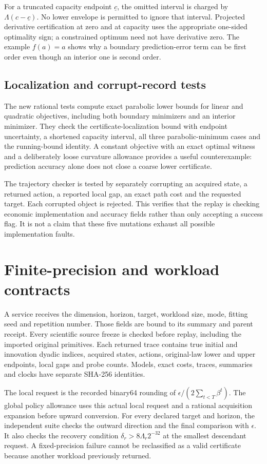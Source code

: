 For a truncated capacity endpoint $\underline c$, the omitted interval is charged by $\Lambda(c-\underline c)$. No lower envelope is permitted to ignore that interval. Projected derivative certification at zero and at capacity uses the appropriate one-sided optimality sign; a constrained optimum need not have derivative zero. The example $f(a)=a$ shows why a boundary prediction-error term can be first order even though an interior one is second order.

\subsection{Localization and corrupt-record tests}
The new rational tests compute exact parabolic lower bounds for linear and quadratic objectives, including both boundary minimizers and an interior minimizer. They check the certificate-localization bound with endpoint uncertainty, a shortened capacity interval, all three parabolic-minimum cases and the running-bound identity. A constant objective with an exact optimal witness and a deliberately loose curvature allowance provides a useful counterexample: prediction accuracy alone does not close a coarse lower certificate.

The trajectory checker is tested by separately corrupting an acquired state, a returned action, a reported local gap, an exact path cost and the requested target. Each corrupted object is rejected. This verifies that the replay is checking economic implementation and accuracy fields rather than only accepting a success flag. It is not a claim that these five mutations exhaust all possible implementation faults.

\section{Finite-precision and workload contracts}\label{supp:contract65}
A service receives the dimension, horizon, target, workload size, mode, fitting seed and repetition number. Those fields are bound to its summary and parent receipt. Every scientific source freeze is checked before replay, including the imported original primitives. Each returned trace contains true initial and innovation dyadic indices, acquired states, actions, original-law lower and upper endpoints, local gaps and probe counts. Models, exact costs, traces, summaries and clocks have separate SHA-256 identities.

The local request is the recorded binary64 rounding of $\epsilon/(2\sum_{t<T}\beta^t)$. The global policy allowance uses this actual local request and a rational acquisition expansion before upward conversion. For every declared target and horizon, the independent suite checks the outward direction and the final comparison with $\epsilon$. It also checks the recovery condition $\delta_r>8\Lambda_r2^{-32}$ at the smallest descendant request. A fixed-precision failure cannot be reclassified as a valid certificate because another workload previously returned.

